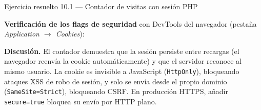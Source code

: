 \begin{cajaejemplo}{Ejercicio resuelto 10.1 --- Contador de visitas con sesión PHP}
\begin{center}
\end{center}

\textbf{Verificación de los flags de seguridad} con DevTools del
navegador (pestaña \emph{Application $\to$ Cookies}):

\begin{center}
\end{center}

\textbf{Discusión.} El contador demuestra que la sesión persiste
entre recargas (el navegador reenvía la cookie automáticamente) y
que el servidor reconoce al mismo usuario. La cookie es invisible a
JavaScript (\texttt{HttpOnly}), bloqueando ataques XSS de robo de
sesión, y solo se envía desde el propio dominio
(\texttt{SameSite=Strict}), bloqueando CSRF. En producción HTTPS,
añadir \texttt{secure=true} bloquea su envío por HTTP plano.
\end{cajaejemplo}

